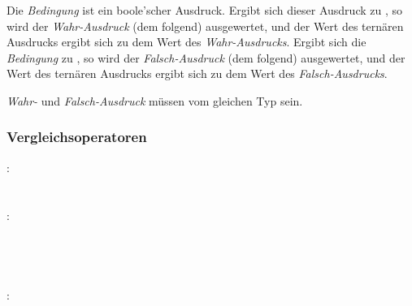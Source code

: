 Die \emph{Bedingung} ist ein boole'scher Ausdruck. Ergibt sich dieser Ausdruck zu ,
so wird der \emph{Wahr-Ausdruck} (dem  folgend) ausgewertet, und der Wert des ternären
Ausdrucks ergibt sich zu dem Wert des \emph{Wahr-Ausdrucks}.
Ergibt sich die \emph{Bedingung} zu , so wird der \emph{Falsch-Ausdruck} (dem \kw{:} folgend)
ausgewertet, und der Wert des ternären
Ausdrucks ergibt sich zu dem Wert des \emph{Falsch-Ausdrucks}.

\emph{Wahr-} und \emph{Falsch-Ausdruck} müssen vom gleichen Typ sein.


\subsubsection{Vergleichsoperatoren}\label{Vergleichsoperatoren}
:\label{asdr_gleichheit}\\
\hspace*{1cm} \\
\hspace*{1cm}  \\
:\label{asdr_gleichheit_operanden}\\
\hspace*{1cm}\glq\Gt{!=}\grq  {} \\
\hspace*{1cm}\glq\Gt{!=}\grq  {}  \\
\hspace*{1cm}\glq\Gt{==}\grq  {} \\
\hspace*{1cm}\glq\Gt{==}\grq  {}  \\
:\label{asdr_vergleich}\\
\hspace*{1cm} \\
\hspace*{1cm}  \\
